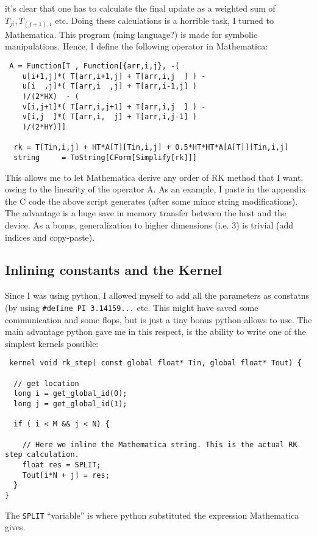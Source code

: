 \documentclass[paper=a4, fontsize=11pt]{scrartcl} %
\numberwithin{equation}{section} %
\numberwithin{figure}{section} %
\numberwithin{table}{section} %
\newcommand{\coder}[1]{\texttt{#1}}
\begin{document}
 it's clear that one has to calculate the final update as a weighted sum of $T_{ji}, T_{(j+1),i}$ etc. 
Doing these calculations is a horrible task, I turned to Mathematica. This program (ming language?) is made for symbolic manipulations. 
Hence, I define the following operator in Mathematica:

\begin{verbatim}
 A = Function[T , Function[{arr,i,j}, -(
    u[i+1,j]*( T[arr,i+1,j] + T[arr,i,j  ] ) -
    u[i  ,j]*( T[arr,i  ,j] + T[arr,i-1,j] )
    )/(2*HX)  - (
    v[i,j+1]*( T[arr,i,j+1] + T[arr,i,j  ] ) - 
    v[i,j  ]*( T[arr,i,  j] + T[arr,i,j-1] )
    )/(2*HY)]]
  
  rk = T[Tin,i,j] + HT*A[T][Tin,i,j] + 0.5*HT*HT*A[A[T]][Tin,i,j]
  string     = ToString[CForm[Simplify[rk]]]
\end{verbatim}

This allows me to let Mathematica derive any order of RK method that I want, owing to the linearity of the operator A. 
As an example, I paste in the appendix the C code the above script generates (after some minor string modifications). 
The advantage is a huge save in memory transfer between the host and the device. As a bonus, generalization to higher
dimensions (i.e. 3) is trivial (add indices and copy-paste).

\subsection{Inlining constants and the Kernel}
Since I was using python, I allowed myself to add all the parameters as constatns (by using \coder{\#define PI 3.14159...} etc. This 
might have saved some communication and some flops, but is just a tiny bonus python allows to use. The main advantage python gave me
in this respect, is the ability to write one of the simplest kernels possible:
\begin{verbatim}
 kernel void rk_step( const global float* Tin, global float* Tout) {

  // get location
  long i = get_global_id(0);  
  long j = get_global_id(1);  

  if ( i < M && j < N) {
  
    // Here we inline the Mathematica string. This is the actual RK step calculation.
    float res = SPLIT;
    Tout[i*N + j] = res;
  }
}

\end{verbatim}
The \coder{SPLIT} ``variable'' is where python substituted the expression Mathematica gives.
\end{document}
